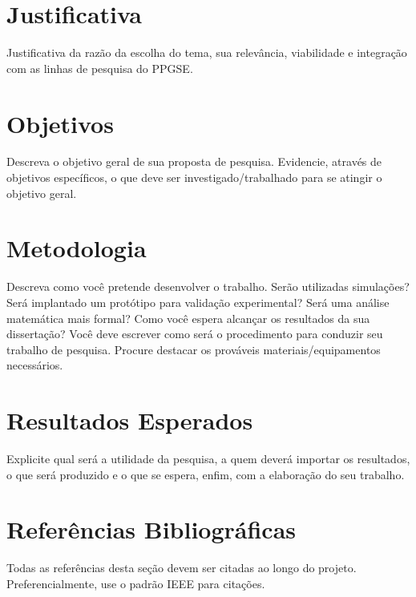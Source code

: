 \documentclass[a4paper,12pt]{article}
\begin{document}
\section{Justificativa}
Justificativa da razão da escolha do tema, sua relevância, viabilidade e integração com as linhas de pesquisa do PPGSE.



\section{Objetivos}
Descreva o objetivo geral de sua proposta de pesquisa. Evidencie, através de objetivos específicos, o que deve ser investigado/trabalhado para se atingir o objetivo geral.


\section{Metodologia}
Descreva como você pretende desenvolver o trabalho. Serão utilizadas simulações? Será implantado um protótipo para validação experimental? Será uma análise matemática mais formal? Como você espera alcançar os resultados da sua dissertação? Você deve escrever como será o procedimento para conduzir seu trabalho de pesquisa. Procure destacar os prováveis materiais/equipamentos necessários.


\section{Resultados Esperados}
Explicite qual será a utilidade da pesquisa, a quem deverá importar os resultados, o que será produzido e o que se espera, enfim, com a elaboração do seu trabalho. 


\section*{Referências Bibliográficas}
Todas as referências desta seção devem ser citadas ao longo do projeto. Preferencialmente, use o padrão IEEE para citações.


%
%
\end{document}
